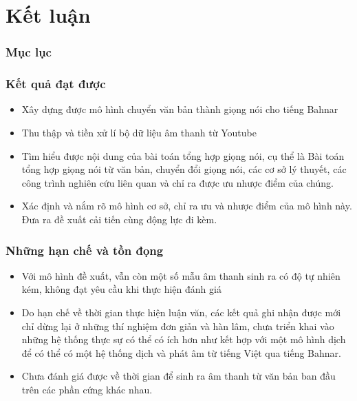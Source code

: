 \documentclass{beamer}
\numberwithin{figure}{section}
\numberwithin{table}{section}
\begin{document}



\section{Kết luận}
{
    \begin{frame}
        \frametitle{Mục lục}
        \tableofcontents[currentsection]
    \end{frame}
}%
\begin{frame}
\frametitle{Kết quả đạt được}
\begin{itemize}
    \item [--] Xây dựng được mô hình chuyển văn bản thành giọng nói cho tiếng Bahnar
    \item [--] Thu thập và tiền xử lí bộ dữ liệu âm thanh từ Youtube 
    \item[--] Tìm hiểu được nội dung của bài toán tổng hợp giọng nói, cụ thể là Bài toán tổng hợp giọng nói từ văn bản, chuyển đổi giọng nói, các cơ sở lý thuyết, các công trình nghiên cứu liên quan và chỉ ra được ưu nhược điểm của chúng.
    \item[--] Xác định và nắm rõ mô hình cơ sở, chỉ ra ưu và nhược điểm của mô hình này. Đưa ra đề xuất cải tiến cùng động lực đi kèm.

\end{itemize}
\end{frame}

\begin{frame}
\frametitle{Những hạn chế và tồn đọng}
\begin{itemize}
    \item[--] Với mô hình đề xuất, vẫn còn một số mẫu âm thanh sinh ra có độ tự nhiên kém, không đạt yêu cầu khi thực hiện đánh giá 

    \item[--] Do hạn chế về thời gian thực hiện luận văn, các kết quả ghi nhận được mới chỉ dừng lại ở những thí nghiệm đơn giản và hàn lâm, chưa triển khai vào những hệ thống thực sự có thể có ích hơn như kết hợp với một mô hình dịch để có thể có một hệ thống dịch và phát âm từ tiếng Việt qua tiếng Bahnar.

    \item[--] Chưa đánh giá được về thời gian để sinh ra âm thanh từ văn bản ban đầu trên các phần cứng khác nhau.
    
\end{itemize}
\end{frame}
\end{document}
